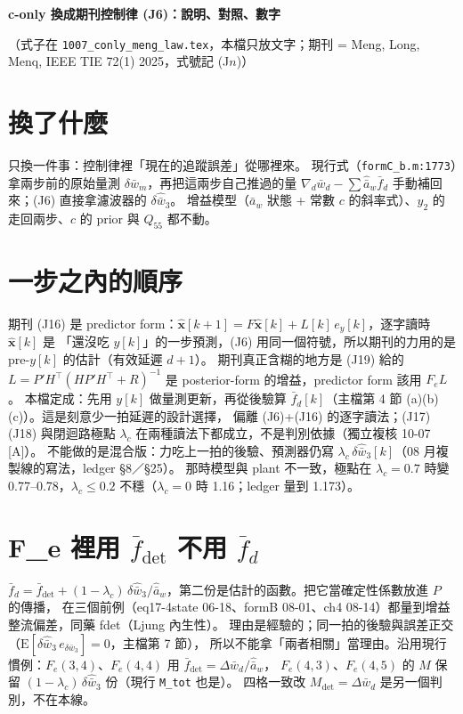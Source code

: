 \documentclass[11pt,a4paper]{ctexart}
\newcommand{\ba}{\bar{a}}
\newcommand{\bw}{\bar{w}}
\newcommand{\ah}{\hat{\ba}_w}
\newcommand{\lc}{\lambda_c}
\newcommand{\fd}{\bar{f}_d}
\newcommand{\fdet}{\bar{f}_{\det}}
\begin{document}
\begin{center}\textbf{\large c-only 換成期刊控制律 (J6)：說明、對照、數字}\end{center}
（式子在 \texttt{1007\_conly\_meng\_law.tex}，本檔只放文字；期刊 = Meng, Long, Menq, IEEE TIE 72(1) 2025，式號記 (J$n$)）

\section{換了什麼}

只換一件事：控制律裡「現在的追蹤誤差」從哪裡來。
現行式（\texttt{formC\_b.m:1773}）拿兩步前的原始量測 $\delta\bw_m$，再把這兩步自己推過的量
$\nabla_d\bw_d - \sum\ah\fd$ 手動補回來；(J6) 直接拿濾波器的 $\delta\hat{\bw}_3$。
增益模型（$\ba_w$ 狀態 + 常數 $c$ 的斜率式）、$y_2$ 的走回兩步、$c$ 的 prior 與 $Q_{55}$ 都不動。

\section{一步之內的順序}

期刊 (J16) 是 predictor form：$\hat{\mathbf{x}}[k+1] = F\hat{\mathbf{x}}[k] + L[k]\,e_y[k]$，逐字讀時 $\hat{\mathbf{x}}[k]$ 是
「還沒吃 $y[k]$」的一步預測，(J6) 用同一個符號，所以期刊的力用的是 pre-$y[k]$ 的估計（有效延遲 $d + 1$）。
期刊真正含糊的地方是 (J19) 給的 $L = P'H^{\top}(HP'H^{\top} + R)^{-1}$ 是 posterior-form 的增益，predictor form 該用 $F_e L$。
本檔定成：先用 $y[k]$ 做量測更新，再從後驗算 $\fd[k]$（主檔第 4 節 (a)(b)(c)）。這是刻意少一拍延遲的設計選擇，
偏離 (J6)+(J16) 的逐字讀法；(J17)(J18) 與閉迴路極點 $\lc$ 在兩種讀法下都成立，不是判別依據（獨立複核 10-07 [A]）。
不能做的是混合版：力吃上一拍的後驗、預測器仍寫 $\lc\,\delta\hat{\bw}_3[k]$（08 月複製線的寫法，ledger §8／§25）。
那時模型與 plant 不一致，極點在 $\lc = 0.7$ 時變 0.77–0.78，$\lc \le 0.2$ 不穩（$\lc = 0$ 時 1.16；ledger 量到 1.173）。

\section{F\_e 裡用 $\fdet$ 不用 $\fd$}

$\fd = \fdet + (1-\lc)\,\delta\hat{\bw}_3/\ah$，第二份是估計的函數。把它當確定性係數放進 $P$ 的傳播，
在三個前例（eq17-4state 06-18、formB 08-01、ch4 08-14）都量到增益整流偏差，同藥 fdet（Ljung 內生性）。
理由是經驗的；同一拍的後驗與誤差正交（$\mathrm{E}[\delta\hat{\bw}_3\,e_{\delta\bw_3}] = 0$，主檔第 7 節），
所以不能拿「兩者相關」當理由。沿用現行慣例：$F_e(3,4)$、$F_e(4,4)$ 用 $\fdet = \Delta\bw_d/\ah$，
$F_e(4,3)$、$F_e(4,5)$ 的 $M$ 保留 $(1-\lc)\,\delta\hat{\bw}_3$ 份（現行 \texttt{M\_tot} 也是）。
四格一致改 $M_{\det} = \Delta\bw_d$ 是另一個判別，不在本線。
\end{document}
